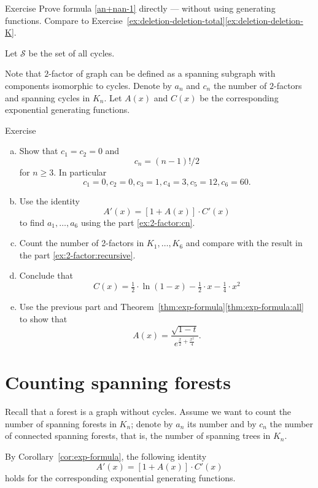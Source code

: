 \begin{thm}{Exercise}
Prove formula \ref{an+nan-1} directly --- without using generating functions.
Compare to Exercise~\ref{ex:deletion-deletion-total}\ref{ex:deletion-deletion-K}.
\end{thm}

Let $\mathcal{S}$ be the set of all cycles.

Note that $2$-factor of graph can be defined as a spanning subgraph with components isomorphic to cycles.
Denote by $a_n$ and $c_n$ the number of $2$-factors and spanning cycles in $K_n$.
Let $A(x)$ and $C(x)$ be the corresponding exponential generating functions.

\begin{thm}{Exercise}
\begin{enumerate}[(a)]
\item\label{ex:2-factor:cn} Show that $c_1=c_2=0$ and 
\[c_n=(n-1)!/2\]
for $n\ge 3$.
In particular 
\[c_1=0, c_2=0, c_3=1, c_4=3, c_5=12, c_6=60.\]
\item\label{ex:2-factor:recursive} Use the identity
\[A'(x)=[1+A(x)]\cdot C'(x)\]
to find $a_1,\dots, a_6$ using the part \ref{ex:2-factor:cn}.
\item Count the number of 2-factors in $K_1,\dots ,K_6$ and compare with the result in the part \ref{ex:2-factor:recursive}.
\item Conclude that 
\[C(x)=\tfrac12\cdot\ln(1-x)-\tfrac12\cdot x-\tfrac14\cdot x^2\]
\item Use the previous part and Theorem~\ref{thm:exp-formula}\ref{thm:exp-formula:all}
to show that
\[A(x)=\frac{\sqrt{1-t}}{e^{\frac x2+\frac{x^2}4}}.\]


\end{enumerate}

\end{thm}



\section*{Counting spanning forests}

Recall that a forest is a graph without cycles.
Assume we want to count the number of spanning forests in $K_n$;
denote by $a_n$ its number and by $c_n$ the number of connected spanning forests, that is, the number of spanning trees in $K_n$.

By Corollary~\ref{cor:exp-formula}, the following identity
\[A'(x)=[1+A(x)]\cdot C'(x)\]
holds for the corresponding exponential generating functions.

